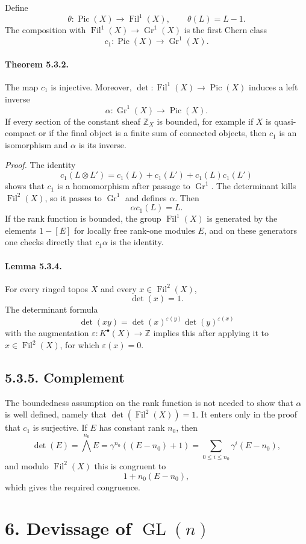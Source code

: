 \documentclass[11pt]{article}
\theoremstyle{plain}
\theoremstyle{definition}
\theoremstyle{remark}
\newcommand{\ZZ}{\mathbb Z}
\DeclareMathOperator{\Pic}{Pic}
\DeclareMathOperator{\Gr}{Gr}
\newcommand{\longto}{\longrightarrow}
\providecommand{\eps}{\varepsilon}
\providecommand{\Gl}{\operatorname{GL}}
\providecommand{\Filt}{\operatorname{Fil}}
\providecommand{\detm}{\operatorname{det}}
\begin{document}
Define
\[
\theta:\Pic(X)\longto\Filt^1(X),\qquad \theta(L)=L-1.
\]
The composition with $\Filt^1(X)\to\Gr^1(X)$ is the first Chern class
\[
c_1:\Pic(X)\longto\Gr^1(X).
\]

\paragraph{Theorem 5.3.2.}
The map $c_1$ is injective. Moreover, $\detm:\Filt^1(X)\to\Pic(X)$ induces a left inverse
\[
\alpha:\Gr^1(X)\longto\Pic(X).
\]
If every section of the constant sheaf $\ZZ_X$ is bounded, for example if $X$ is quasi-compact or if the final object is a finite sum of connected objects, then $c_1$ is an isomorphism and $\alpha$ is its inverse.

\emph{Proof.}
The identity
\[
c_1(L\otimes L')=c_1(L)+c_1(L')+c_1(L)c_1(L')
\]
shows that $c_1$ is a homomorphism after passage to $\Gr^1$. The determinant kills $\Filt^2(X)$, so it passes to $\Gr^1$ and defines $\alpha$. Then
\[
\alpha c_1(L)=L.
\]
If the rank function is bounded, the group $\Filt^1(X)$ is generated by the elements $1-[E]$ for locally free rank-one modules $E$, and on these generators one checks directly that $c_1\alpha$ is the identity.

\paragraph{Lemma 5.3.4.}
For every ringed topos $X$ and every $x\in\Filt^2(X)$,
\[
\detm(x)=1.
\]
The determinant formula
\[
\detm(xy)=\detm(x)^{\eps(y)}\detm(y)^{\eps(x)}
\]
with the augmentation $\eps:K^\bullet(X)\to\ZZ$ implies this after applying it to $x\in\Filt^2(X)$, for which $\eps(x)=0$.

\subsection*{5.3.5. Complement}

The boundedness assumption on the rank function is not needed to show that $\alpha$ is well defined, namely that $\detm(\Filt^2(X))=1$. It enters only in the proof that $c_1$ is surjective. If $E$ has constant rank $n_0$, then
\[
\detm(E)=\bigwedge^{n_0}E
      =\gamma^{n_0}((E-n_0)+1)
      =\sum_{0\leq i\leq n_0}\gamma^i(E-n_0),
\]
and modulo $\Filt^2(X)$ this is congruent to
\[
1+n_0(E-n_0),
\]
which gives the required congruence.

\section*{6. Devissage of $\Gl(n)$}
\end{document}
